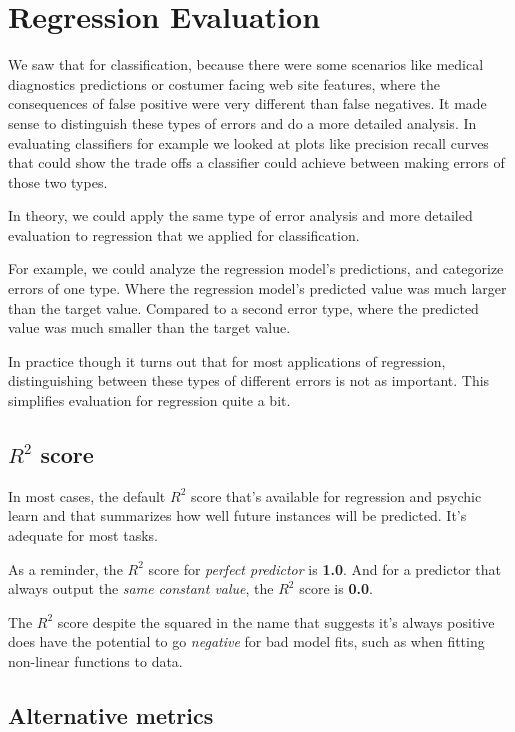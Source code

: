 \section{Regression Evaluation}
\begin{multicols}{2}

We saw that for classification, because there were some scenarios like medical diagnostics predictions or costumer facing web site features, where the consequences of false positive were very different than false negatives. It made sense to distinguish these types of errors and do a more detailed analysis. In evaluating classifiers for example we looked at plots like precision recall curves that could show the trade offs a classifier could achieve between making errors of those two types. 

In theory, we could apply the same type of error analysis and more detailed evaluation to regression that we applied for classification. 

For example, we could analyze the regression model's predictions, and categorize errors of one type. Where the regression model's predicted value was much larger than the target value. Compared to a second error type, where the predicted value was much smaller than the target value. 

In practice though it turns out that for most applications of regression, distinguishing between these types of different errors is not as important. 
This simplifies evaluation for regression quite a bit. 

\subsection{$R^2$ score}

In most cases, the default $R^2$ score that's available for regression and psychic learn and that summarizes how well future instances will be predicted. It's adequate for most tasks. 

As a reminder, the $R^2$ score for \emph{perfect predictor} is \textbf{1.0}. And for a predictor that always output the \emph{same constant value}, the $R^2$ score is \textbf{0.0}. 

The $R^2$ score despite the squared in the name that suggests it's always positive does have the potential to go \emph{negative} for bad model fits, such as when fitting non-linear functions to data. 

\subsection{Alternative metrics}


\end{multicols}
